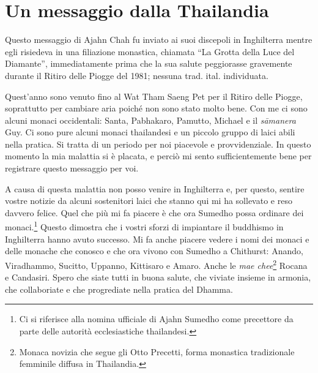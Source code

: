 \chapter{Un messaggio dalla Thailandia}

\begin{openingQuote}
  \centering

  Questo messaggio di Ajahn Chah fu inviato ai suoi discepoli in Inghilterra
  mentre egli risiedeva in una filiazione monastica, chiamata ``La Grotta della
  Luce del Diamante'', immediatamente prima che la sua salute peggiorasse
  gravemente durante il Ritiro delle Piogge del 1981; nessuna trad. ital.
  individuata.
\end{openingQuote}

Quest'anno sono venuto fino al Wat Tham Saeng Pet per il Ritiro delle
Piogge, soprattutto per cambiare aria poiché non sono stato molto bene.
Con me ci sono alcuni monaci occidentali: Santa, Pabhakaro, Pamutto,
Michael e il \emph{sāmanera} Guy. Ci sono pure alcuni monaci thailandesi
e un piccolo gruppo di laici abili nella pratica. Si tratta di un
periodo per noi piacevole e provvidenziale. In questo momento la mia
malattia si è placata, e perciò mi sento sufficientemente bene per
registrare questo messaggio per voi.

A causa di questa malattia non posso venire in Inghilterra e, per
questo, sentire vostre notizie da alcuni sostenitori laici che stanno
qui mi ha sollevato e reso davvero felice. Quel che più mi fa piacere è
che ora Sumedho possa ordinare dei monaci.\footnote{Ci si riferisce alla
  nomina ufficiale di Ajahn Sumedho come precettore da parte delle
  autorità ecclesiastiche thailandesi.} Questo dimostra che i vostri
sforzi di impiantare il buddhismo in Inghilterra hanno avuto successo.
Mi fa anche piacere vedere i nomi dei monaci e delle monache che conosco
e che ora vivono con Sumedho a Chithurst: Anando, Viradhammo, Sucitto,
Uppanno, Kittisaro e Amaro. Anche le \emph{mae chee}\footnote{Monaca
  novizia che segue gli Otto Precetti, forma monastica tradizionale
  femminile diffusa in Thailandia.} Rocana e Candasiri. Spero che siate
tutti in buona salute, che viviate insieme in armonia, che collaboriate
e che progrediate nella pratica del Dhamma.

